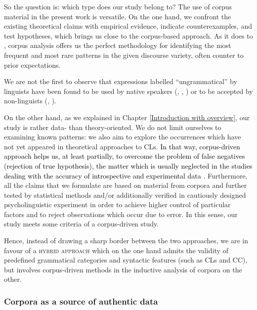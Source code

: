 So the question is: which type does our study belong to? The use of corpus material in the present work is versatile. On the one hand, we confront the existing theoretical claims with empirical evidence, indicate counterexamples, and test hypotheses, which brings us close to the corpus-based approach. As it does to \citet{Biber15}, corpus analysis offers us the perfect methodology for identifying the most frequent and most rare patterns in the given discourse variety, often counter to prior expectations. 

We are not the first to observe that expressions labelled ``ungrammatical'' by linguists have been found to be used by native speakers (\citealt[cf.][]{Sampson01}, \citealt{Stefanowitsch07}, \citealt{BresnanNikitina09}) or to be accepted by non-linguists (\citealt[cf.][]{WasowArnold05}, \citealt{Bresnan07}).

On the other hand, as we explained in Chapter \ref{Introduction with overview}, our study is rather data- than theory-oriented. We do not limit ourselves to examining known patterns: we also aim to explore the occurrences which have not yet appeared in theoretical approaches to CLs. \textcolor{black}{In that way, corpus-driven approach helps us, at least partially, to overcome the problem of false negatives (rejection of true hypothesis), the matter which is usually neglected in the studies dealing with the accuracy of introspective and experimental data \citep[cf.][611--612]{SprouseAlmeida12}.}
Furthermore, all the claims that we formulate are based on material from corpora and further tested by statistical methods and/or additionally verified in cautiously designed psycholinguistic experiment in order to achieve higher control of particular factors and to reject observations which occur due to error. In this sense, our study meets some criteria of a corpus-driven study. 

Hence, instead of drawing a sharp border between the two approaches, we are in favour of a \textsc{hybrid} \textsc{approach} \citep{Biber15} which on the one hand admits the validity of predefined grammatical categories and syntactic features (such as CLs and CC), but involves corpus-driven methods in the inductive analysis of corpora on the other. 

\subsubsection{Corpora as a source of authentic data}

